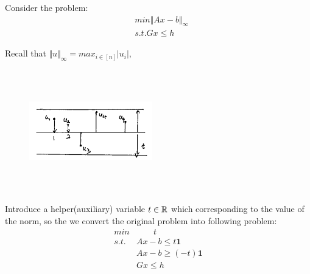 


\begin{example}
	Consider the problem:
	\begin{align*}
		&min \Vert Ax - b\Vert_{\infty}\\
		&s.t. Gx \leq h
	\end{align*}
	
	Recall that $\Vert u\Vert_{\infty} = max_{i\in [n]}|u_i|$,
	\begin{figure}
		\centering
		\includegraphics[width=2.1in,height=2.1in]{figures/ch07/figure1016_2.png}
	\end{figure}
	
	Introduce a helper(auxiliary) variable $t\in \mathbb{R}$ which corresponding to the value of the norm, so the we convert the original problem into following problem:	
	\begin{align*}
		min &\qquad t\\
		s.t. &Ax - b\leq t\textbf{1}\\
		&Ax - b\geq (-t)\textbf{1}\\
		&Gx \leq h
	\end{align*}
\end{example}


